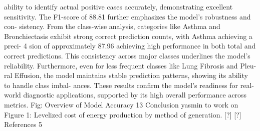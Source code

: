 ability to identify actual positive cases accurately,
demonstrating excellent sensitivity. The F1-score of
88.81%
further emphasizes the model’s robustness and con-
sistency.
From the class-wise analysis, categories like
Asthma and Bronchiectasis exhibit strong correct
prediction counts, with Asthma achieving a preci-
4
sion of approximately 87.96%
achieving high performance in both total and correct
predictions. This consistency across major classes
underlines the model’s reliability. Furthermore, even
for less frequent classes like Lung Fibrosis and Pleu-
ral Effusion, the model maintains stable prediction
patterns, showing its ability to handle class imbal-
ances. These results confirm the model’s readiness
for real-world diagnostic applications, supported
by its high overall performance across metrics.
Fig: Overview of Model Accuracy
13 Conclusion
yasmin to work on
Figure 1: Levelized cost of energy production by
method of generation. [?]
[?]
References
5
